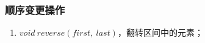 \subsubsection{顺序变更操作}
\begin{enumerate}
    \item $void\ reverse(first,\ last)$，翻转区间中的元素；
\end{enumerate}